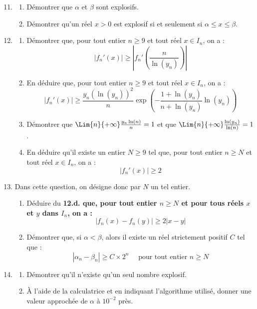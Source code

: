 \documentclass[landscape,twocolumn,leqno,a4paper,10pt]{report} %
\newcommand\q{\quad}
\renewcommand{\geq}{\geqslant}
\renewcommand{\leq}{\leqslant}
\renewcommand{\textbf}[1]{\begingroup\bfseries\mathversion{bold}#1\endgroup}		%
\begin{document}
\begin{enumerate}\setcounter{enumi}{10}
	\item \begin{enumerate}
		\item Démontrer que $\alpha$ et $\beta$ sont explosifs.
		\item Démontrer qu'un réel $x>0$ est explosif si et seulement si $\alpha \leq x \leq \beta$.
	\end{enumerate}
	\item \begin{enumerate}
		\item Démontrer que, pour tout entier $n \geq 9$ et tout réel $x \in I_{n}$, on a :
		$$\left|f_{n}'(x)\right| \geq\left|f_{n}'\left(\frac{n}{\ln \left(y_{n}\right)}\right)\right|$$
		\item En déduire que, pour tout entier $n \geq 9$ et tout réel $x \in I_{n}$, on a :
		$$\left|f_{n}'(x)\right| \geq \frac{y_{n}\left(\ln \left(y_{n}\right)\right)^{2}}{n} \exp \left(-\frac{1+\ln \left(y_{n}\right)}{n+\ln \left(y_{n}\right)} \ln \left(y_{n}\right)\right)$$
		\item Démontrer que $\Lim{n}{+\infty}\frac{y_{n} \ln (n)}{n}=1$ et que $\Lim{n}{+\infty}\frac{\ln \left(y_{n}\right)}{\ln (n)}=1$.
		\item En déduire qu'il existe un entier $N \geq 9$ tel que, pour tout entier $n \geq N$ et tout réel $x \in I_{n}$, on a :
		$$\left|f_{n}'(x)\right| \geq 2$$
	\end{enumerate}
	\item Dans cette question, on désigne donc par $N$ un tel entier.
	\begin{enumerate}
		\item Déduire du \textbf{12.d.} que, pour tout entier $n \geq N$ et pour tous réels $x$ et $y$ dans $I_{n}$, on a :
		$$\left|f_{n}(x)-f_{n}(y)\right| \geq 2|x-y|$$
		\item Démontrer que, si $\alpha<\beta$, alors il existe un réel strictement positif $C$ tel que :
		$$\left|\alpha_{n}-\beta_{n}\right| \geq C \times 2^{n} \q\text { pour tout entier } n \geq N$$
	\end{enumerate}
	\item \begin{enumerate}
		\item Démontrer qu'il n'existe qu'un seul nombre explosif.
		\item À l'aide de la calculatrice et en indiquant l'algorithme utilisé, donner une valeur approchée de $\alpha$ à $10^{-2}$ près.
	\end{enumerate}
\end{enumerate}
\end{document}
